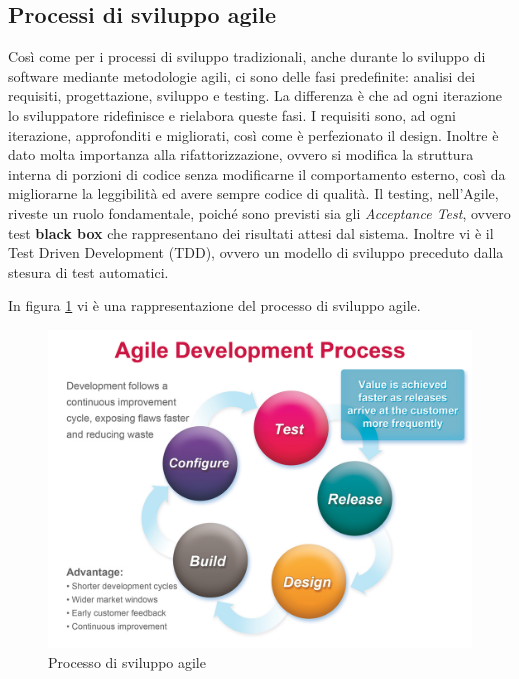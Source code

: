 \subsection{Processi di sviluppo agile}
Così come per i processi di sviluppo tradizionali, anche durante lo sviluppo di software mediante metodologie agili, ci sono delle fasi predefinite: analisi dei requisiti, progettazione, sviluppo e testing. La differenza è che ad ogni iterazione lo sviluppatore ridefinisce e rielabora queste fasi.
I requisiti sono, ad ogni iterazione, approfonditi e migliorati, così come è perfezionato il design. Inoltre è dato molta importanza alla rifattorizzazione, ovvero si modifica la struttura interna di porzioni di codice senza modificarne il comportamento esterno, così da migliorarne la leggibilità ed avere sempre codice di qualità.
Il testing, nell'Agile, riveste un ruolo fondamentale, poiché sono previsti sia gli \textit{Acceptance Test}, ovvero test \textbf{black box} che rappresentano dei risultati attesi dal sistema.
Inoltre vi è il Test Driven Development (TDD), ovvero un modello di sviluppo preceduto dalla stesura di test automatici.

In figura \ref{agiledevelopment} vi è una rappresentazione del processo di sviluppo agile.

\begin{figure}[h!]
\begin{center}
\includegraphics[scale=0.23]{imgs/agiledevelopment.jpg}
\caption{Processo di sviluppo agile\label{agiledevelopment}} 
\end{center}
\end{figure}

